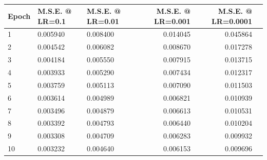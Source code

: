 \documentclass{exam}
\begin{document}
		\begin{table}[h!]
  			\begin{center}
    			\caption{}
    			\begin{tabular}{l|l|l|r|r|r}
      				\textbf{Epoch} & \textbf{M.S.E. @ LR=0.1} & \textbf{M.S.E. @ LR=0.01} & \textbf{M.S.E. @ LR=0.001} & \textbf{M.S.E. @ LR=0.0001}\\
      				\hline
      				\rowcolor{pink} 1 & 0.005940 & 0.008400 & 0.014045 & 0.045864 \\
      				2 & 0.004542 & 0.006082 & 0.008670 & 0.017278 \\
      				3 & 0.004184 & 0.005550 & 0.007915 & 0.013715 \\
      				4 & 0.003933 & 0.005290 & 0.007434 & 0.012317 \\
      				5 & 0.003759 & 0.005113 & 0.007090 & 0.011503 \\
      				6 & 0.003614 & 0.004989 & 0.006821 & 0.010939 \\
      				7 & 0.003496 & 0.004879 & 0.006613 & 0.010531 \\
      				8 & 0.003392 & 0.004793 & 0.006440 & 0.010204 \\
      				9 & 0.003308 & 0.004709 & 0.006283 & 0.009932 \\
      				\rowcolor{yellow} 10 & 0.003232 & 0.004640 & 0.006153 & 0.009696 \\

\end{tabular}
\end{center}
\end{table}
\end{document}
